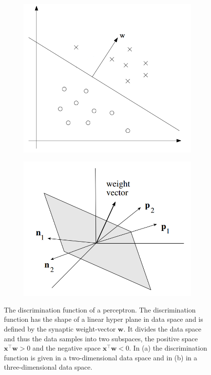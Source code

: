 \begin{figure}
	\centering
	\begin{subfigure}[t]{.45\textwidth}
	 	\centering
  		\includegraphics[width=.9\linewidth]{imgs/percept_discr1.png}
  		\caption{}
	\end{subfigure}
	\begin{subfigure}[t]{.45\textwidth}
	 	\centering
  		\includegraphics[width=.9\linewidth]{imgs/percept_discr2.png}
  		 \caption{}
	\end{subfigure}
    \caption[The discrimination function of a perceptron.]{The discrimination function of a perceptron. The discrimination function has the shape of a linear hyper plane in data space and is defined by the synaptic weight-vector $\textbf{w}$. It divides the data space and thus the data samples into two subspaces, the positive space $\textbf{x}^{\intercal}\textbf{w} > 0$ and the negative space $\textbf{x}^{\intercal}\textbf{w} < 0$. In (a) the discrimination function is given in a two-dimensional data space and in (b) in a three-dimensional data space.}
	\label{fig:discrimation}
\end{figure}


